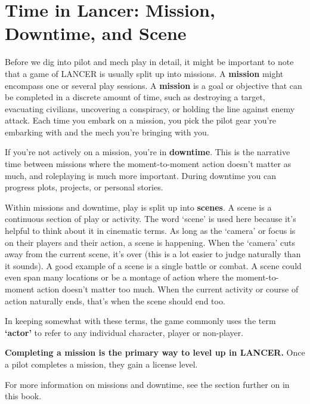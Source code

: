 \section{Time in Lancer: Mission, Downtime, and Scene}

Before we dig into pilot and mech play in detail, it might be important to note that a game of
LANCER is usually split up into missions. A \textbf{mission} might encompass one or several play
sessions. A \textbf{mission} is a goal or objective that can be completed in a discrete amount of time,
such as destroying a target, evacuating civilians, uncovering a conspiracy, or holding the line
against enemy attack. Each time you embark on a mission, you pick the pilot gear you’re
embarking with and the mech you’re bringing with you.

If you’re not actively on a mission, you’re in \textbf{downtime}. This is the narrative time between
missions where the moment-to-moment action doesn’t matter as much, and roleplaying is much
more important. During downtime you can progress plots, projects, or personal stories.

Within missions and downtime, play is split up into \textbf{scenes}. A scene is a continuous section of
play or activity. The word ‘scene’ is used here because it’s helpful to think about it in cinematic
terms. As long as the ‘camera’ or focus is on their players and their action, a scene is happening.
When the ‘camera’ cuts away from the current scene, it’s over (this is a lot easier to judge
naturally than it sounds). A good example of a scene is a single battle or combat. A scene could
even span many locations or be a montage of action where the moment-to-moment action
doesn’t matter too much. When the current activity or course of action naturally ends, that’s
when the scene should end too.

In keeping somewhat with these terms, the game commonly uses the term \textbf{‘actor’} to refer to any
individual character, player or non-player.

\textbf{Completing a mission is the primary way to level up in LANCER.} Once a pilot completes a
mission, they gain a license level.

For more information on missions and downtime, see the section further on in this book.
